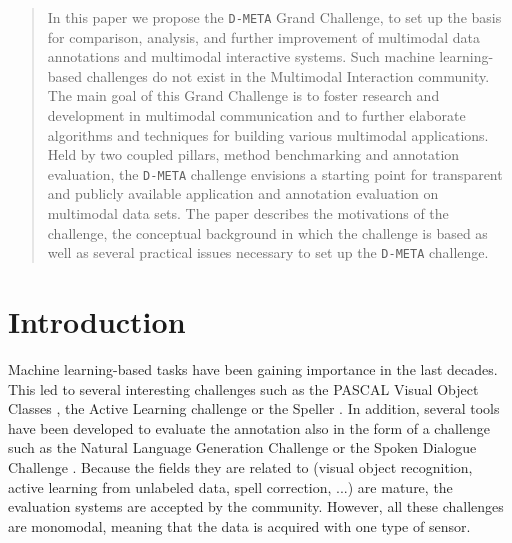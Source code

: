 \documentclass{sig-alternate}
\begin{document}
\toappear{}


\maketitle
\begin{abstract}
In this paper we propose the \texttt{D-META} Grand Challenge, to set up the basis for comparison, analysis, and further
improvement of multimodal data annotations and multimodal interactive systems. Such machine learning-based challenges do
not exist in the Multimodal Interaction community. The main goal of this Grand Challenge is to foster research and
development in multimodal communication and to further elaborate algorithms and techniques for building various
multimodal applications. Held by two coupled pillars, method benchmarking and annotation evaluation, the \texttt{D-META}
challenge envisions a starting point for transparent and publicly available application and annotation evaluation on
multimodal data sets. The paper describes the motivations of the challenge, the conceptual background in which the
challenge is based as well as several practical issues necessary to set up the \texttt{D-META} challenge.
\end{abstract}
\section{Introduction}
Machine learning-based tasks have been gaining importance in the last decades. This led to several interesting
challenges such as the PASCAL Visual Object Classes \cite{PascalVOC}, the Active Learning challenge
\cite{ActiveLearning} or the Speller \cite{Speller}. In addition, several tools have been developed to evaluate the
annotation also in the form of a challenge such as the Natural Language Generation Challenge \cite{Give} or
the Spoken Dialogue Challenge \cite{SDS}. Because the fields they are related to
(visual object recognition, active learning from unlabeled data, spell correction, ...) are mature, the
evaluation systems are accepted by the community. However, all these challenges are monomodal,
meaning that the data is acquired with one type of sensor.\vspace{0.4cm}
\end{document}
